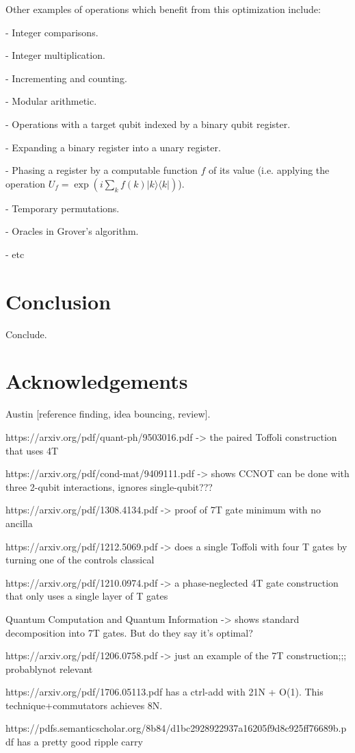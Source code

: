\documentclass[twocolumn,longbibliography]{quantumarticle-customized}
\begin{document}
Other examples of operations which benefit from this optimization include:

- Integer comparisons.

- Integer multiplication.

- Incrementing and counting.

- Modular arithmetic.

- Operations with a target qubit indexed by a binary qubit register.

- Expanding a binary register into a unary register.

- Phasing a register by a computable function $f$ of its value (i.e. applying the operation $U_f = \exp\left( i \sum_k f(k) |k\rangle \langle k| \right)$).

- Temporary permutations.

- Oracles in Grover's algorithm.

- etc


\section{Conclusion}
\label{sec:conclusion}

Conclude.

\section{Acknowledgements}

Austin [reference finding, idea bouncing, review].





https://arxiv.org/pdf/quant-ph/9503016.pdf   ->   the paired Toffoli construction that uses 4T

https://arxiv.org/pdf/cond-mat/9409111.pdf   -> shows CCNOT can be done with three 2-qubit interactions, ignores single-qubit???


https://arxiv.org/pdf/1308.4134.pdf -> proof of 7T gate minimum with no ancilla

https://arxiv.org/pdf/1212.5069.pdf  ->   does a single Toffoli with four T gates by turning one of the controls classical

https://arxiv.org/pdf/1210.0974.pdf  ->   a phase-neglected 4T gate construction that only uses a single layer of T gates


Quantum Computation and Quantum Information -> shows standard decomposition into 7T gates. But do they say it's optimal?

https://arxiv.org/pdf/1206.0758.pdf -> just an example of the 7T construction;;; probablynot relevant



https://arxiv.org/pdf/1706.05113.pdf   has a ctrl-add with 21N + O(1). This technique+commutators achieves 8N.


https://pdfs.semanticscholar.org/8b84/d1bc2928922937a16205f9d8c925ff76689b.pdf     has a pretty good ripple carry
\end{document}
